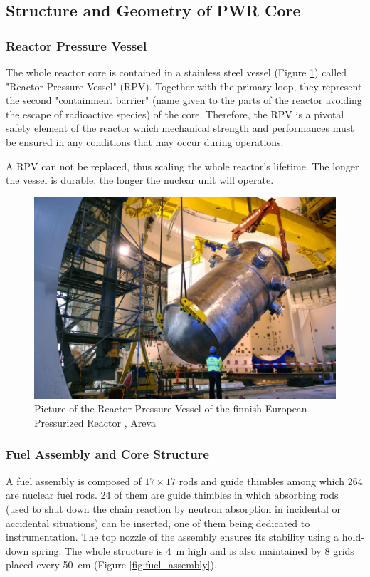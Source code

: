 \subsection{Structure and Geometry of PWR Core}


\subsubsection{Reactor Pressure Vessel}

The whole reactor core is contained in a stainless steel vessel (Figure \ref{fig:vessel_pic}) called "Reactor Pressure Vessel" (RPV). Together with the primary loop, they represent the second "containment barrier" (name given to the parts of the reactor avoiding the escape of radioactive species) of the core. Therefore, the RPV is a pivotal safety element of the reactor which mechanical strength and performances must be ensured in any conditions that may occur during operations.

\begin{note*}{}
A RPV can not be replaced, thus scaling the whole reactor's lifetime. The longer the vessel is durable, the longer the nuclear unit will operate.
\end{note*}




\begin{figure}[!h]
\centering
\includegraphics[width=0.6\linewidth]{img/intro/vessel_pic.jpg}
\caption{Picture of the Reactor Pressure Vessel of the finnish European Pressurized Reactor \cite{nouvelle_cuve_2010}, \textcopyright Areva}
\label{fig:vessel_pic}
\end{figure}

\npar


\subsubsection{Fuel Assembly and Core Structure}

A fuel assembly is composed of $17 \times 17$ rods and guide thimbles among which 264 are nuclear fuel rods. 24 of them are guide thimbles in which absorbing rods (used to shut down the chain reaction by neutron absorption in incidental or accidental situations) can be inserted, one of them being dedicated to instrumentation. The top nozzle of the assembly ensures its stability using a hold-down spring. The whole structure is 4\ m high and is also maintained by 8 grids placed every 50\ cm (Figure \ref{fig:fuel_assembly}). 




